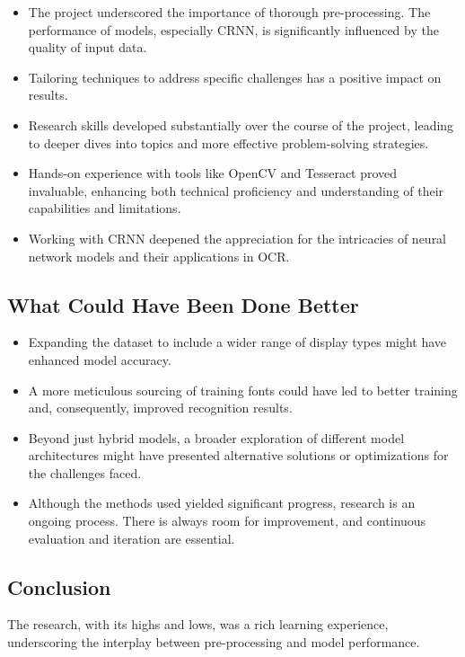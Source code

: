\begin{itemize}
    \item The project underscored the importance of thorough pre-processing. The performance of models, especially CRNN, is significantly influenced by the quality of input data.
    \item Tailoring techniques to address specific challenges has a positive impact on results.
    \item Research skills developed substantially over the course of the project, leading to deeper dives into topics and more effective problem-solving strategies.
    \item Hands-on experience with tools like OpenCV and Tesseract proved invaluable, enhancing both technical proficiency and understanding of their capabilities and limitations.
    \item Working with CRNN deepened the appreciation for the intricacies of neural network models and their applications in OCR.
\end{itemize}

\subsection{What Could Have Been Done Better}

\begin{itemize}
    \item Expanding the dataset to include a wider range of display types might have enhanced model accuracy.
    \item A more meticulous sourcing of training fonts could have led to better training and, consequently, improved recognition results.
    \item Beyond just hybrid models, a broader exploration of different model architectures might have presented alternative solutions or optimizations for the challenges faced.
    \item Although the methods used yielded significant progress, research is an ongoing process. There is always room for improvement, and continuous evaluation and iteration are essential.
\end{itemize}


\subsection{Conclusion}
The research, with its highs and lows, was a rich learning experience, underscoring the interplay between pre-processing and model performance.

